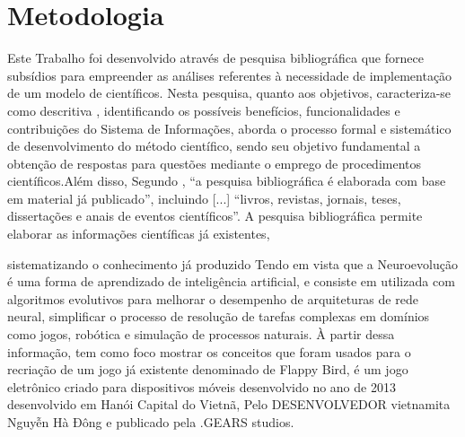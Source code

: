 \section{Metodologia}\label{sec:methods}

Este Trabalho foi desenvolvido através de pesquisa bibliográfica que fornece subsídios
para empreender as análises referentes à necessidade de implementação de um modelo de
científicos. Nesta pesquisa, quanto aos objetivos, caracteriza-se como descritiva\cite{GIL}
, identificando os possíveis benefícios, funcionalidades e contribuições do
Sistema de Informações, aborda o processo formal e sistemático de desenvolvimento do método científico, sendo seu objetivo fundamental a obtenção de respostas para questões mediante o emprego de procedimentos científicos.Além disso, Segundo \cite{GIL}, “a pesquisa bibliográfica é elaborada com base em material
já publicado”, incluindo [...] “livros, revistas, jornais, teses, dissertações e anais de eventos
científicos”. A pesquisa bibliográfica permite elaborar as informações científicas já existentes,

sistematizando o conhecimento já produzido\cite{LEHFELD} 
 Tendo em vista que a Neuroevolução é uma forma de aprendizado de inteligência artificial,  e consiste em utilizada com algoritmos evolutivos para  melhorar o desempenho de arquiteturas de rede neural, simplificar o processo de resolução de tarefas complexas em domínios como jogos, robótica e simulação de processos naturais.\cite{neuroevolucao}
À partir dessa informação, tem como foco mostrar os conceitos que foram usados para o recriação de um jogo já existente denominado de Flappy Bird, é um jogo eletrônico criado para dispositivos móveis desenvolvido no ano  de 2013 desenvolvido em Hanói Capital do Vietnã, Pelo DESENVOLVEDOR vietnamita Nguyễn Hà Đông e publicado pela .GEARS studios.\cite{CriadorJogo}

